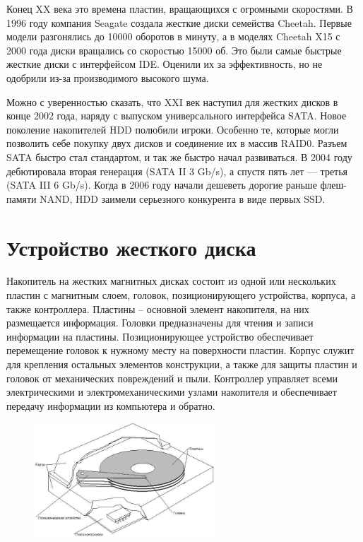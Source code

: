 \documentclass[bachelor, och, referat]{SCWorks}
\begin{document}
Конец XX века это времена пластин, вращающихся с огромными скоростями. В 1996 
году компания Seagate создала жесткие диски семейства Cheetah. Первые модели 
разгонялись до 10000 оборотов в минуту, а в моделях Cheetah X15 с 2000 года 
диски вращались со скоростью 15000 об. Это были самые быстрые жесткие диски с 
интерфейсом IDE. Оценили их за эффективность, но не одобрили из-за 
производимого высокого шума.

Можно с уверенностью сказать, что XXI век наступил для жестких дисков в конце 
2002 года, наряду с выпуском универсального интерфейса SATA. Новое поколение 
накопителей HDD полюбили игроки. Особенно те, которые могли позволить себе 
покупку двух дисков и соединение их в массив RAID0. Разъем SATA быстро стал 
стандартом, и так же быстро начал развиваться. В 2004 году дебютировала вторая 
генерация (SATA II 3 Gb/s), а спустя пять лет — третья (SATA III 6 Gb/s). Когда 
в 2006 году начали дешеветь дорогие раньше флеш-памяти NAND, HDD заимели 
серьезного конкурента в виде первых SSD.


\section{Устройство жесткого диска}

Накопитель на жестких магнитных дисках состоит из одной или нескольких пластин 
с магнитным слоем, головок, позиционирующего устройства, корпуса, а также 
контроллера. Пластины – основной элемент накопителя, на них размещается 
информация. Головки предназначены для чтения и записи информации на пластины. 
Позиционирующее устройство обеспечивает перемещение головок к нужному месту на 
поверхности пластин. Корпус служит для крепления остальных элементов 
конструкции, а также для защиты пластин и головок от механических повреждений 
и пыли. Контроллер управляет всеми электрическими и электромеханическими узлами 
накопителя и обеспечивает передачу информации из компьютера и обратно.

\begin{figure}[H]
    \centering
    \includegraphics[width=0.6\textwidth]{org_hdd.png}
    \caption{}
    \label{}
\end{figure}
\end{document}
